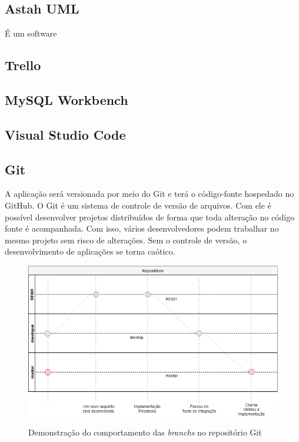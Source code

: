 \subsection{Astah UML}
\label{sub:astah}

É um software

\subsection{Trello}
\label{sub:trello}

\subsection{MySQL Workbench}
\label{sub:workbench}

\subsection{Visual Studio Code}
\label{sub:vscode}

\subsection{Git}
\label{sub:git}

A aplicação será versionada por meio do Git e terá o código-fonte hospedado no GitHub. O Git é um sistema de controle de versão de arquivos. Com ele é possível desenvolver projetos distribuídos de forma que toda alteração no código fonte é acompanhada. Com isso, vários desenvolvedores podem trabalhar no mesmo projeto sem risco de alterações. Sem o controle de versão, o desenvolvimento de aplicações se torna caótico.

\begin{figure}[H]
    \centering
    \caption{Demonstração do comportamento das \textit{branchs} no repositório Git}
    \includegraphics[width=13cm]{dados/figuras/git.png}
    \label{fig:exemplogit}
\end{figure}

